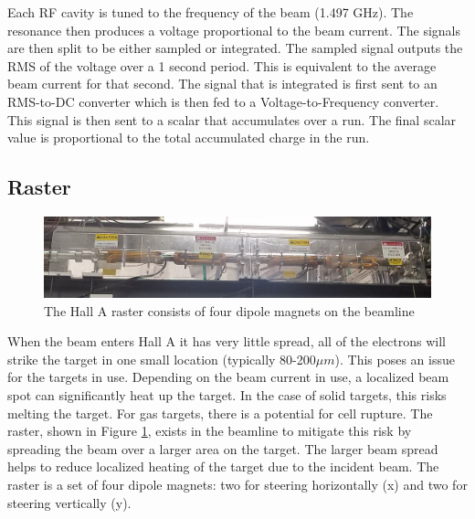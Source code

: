 Each RF cavity is tuned to the frequency of the beam (1.497 GHz). The resonance then produces a voltage proportional to the beam current. The signals are then split to be either sampled or integrated. The sampled signal outputs the RMS of the voltage over a 1 second period. This is equivalent to the average beam current for that second. The signal that is integrated is first sent to an RMS-to-DC converter which is then fed to a Voltage-to-Frequency converter. This signal is then sent to a scalar that accumulates over a run. The final scalar value is proportional to the total accumulated charge in the run.

\subsection{Raster}

\begin{figure}[h]
\begin{center}
	\includegraphics[width=\textwidth]{./setup/fig/raster_pic.jpg}
	\caption{The Hall A raster consists of four dipole magnets on the beamline}
	\label{fig:rasterpic}
\end{center}
\end{figure}

When the beam enters Hall A it has very little spread, all of the electrons will strike the target in one small location (typically 80-200$\mu m$). This poses an issue for the targets in use. Depending on the beam current in use, a localized beam spot can significantly heat up the target. In the case of solid targets, this risks melting the target. For gas targets, there is a potential for cell rupture. The raster, shown in Figure \ref{fig:rasterpic}, exists in the beamline to mitigate this risk by spreading the beam over a larger area on the target. The larger beam spread helps to reduce localized heating of the target due to the incident beam. The raster is a set of four dipole magnets: two for steering horizontally (x) and two for steering vertically (y).\cite{Bob}

